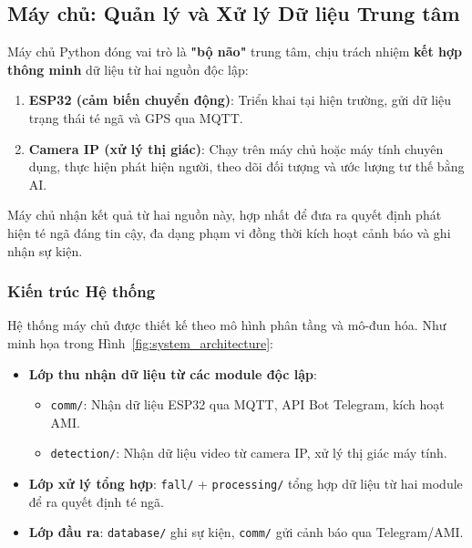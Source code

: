 
\subsection{Máy chủ: Quản lý và Xử lý Dữ liệu Trung tâm}
\label{sec:server_overview}

Máy chủ Python đóng vai trò là \textbf{"bộ não"} trung tâm, chịu trách nhiệm \textbf{kết hợp thông minh} dữ liệu từ hai nguồn độc lập: 
\begin{enumerate}
    \item \textbf{ESP32 (cảm biến chuyển động)}: Triển khai tại hiện trường, gửi dữ liệu trạng thái té ngã và GPS qua MQTT.
    \item \textbf{Camera IP (xử lý thị giác)}: Chạy trên máy chủ hoặc máy tính chuyên dụng, thực hiện phát hiện người, theo dõi đối tượng và ước lượng tư thế bằng AI.
\end{enumerate}

Máy chủ nhận kết quả từ hai nguồn này, hợp nhất để đưa ra quyết định phát hiện té ngã đáng tin cậy, đa dạng phạm vi đồng thời kích hoạt cảnh báo và ghi nhận sự kiện.

\subsubsection{Kiến trúc Hệ thống}
\label{subsubsec:system_overview}

Hệ thống máy chủ được thiết kế theo mô hình phân tầng và mô-đun hóa. Như minh họa trong Hình~\ref{fig:system_architecture}:

\begin{itemize}
    \item \textbf{Lớp thu nhận dữ liệu từ các module độc lập}:
    \begin{itemize}
        \item \texttt{comm/}: Nhận dữ liệu ESP32 qua MQTT, API Bot Telegram, kích hoạt AMI.
        \item \texttt{detection/}: Nhận dữ liệu video từ camera IP, xử lý thị giác máy tính.
    \end{itemize}
    \item \textbf{Lớp xử lý tổng hợp}: \texttt{fall/} + \texttt{processing/} tổng hợp dữ liệu từ hai module để ra quyết định té ngã.
    \item \textbf{Lớp đầu ra}: \texttt{database/} ghi sự kiện, \texttt{comm/} gửi cảnh báo qua Telegram/AMI.
\end{itemize}

